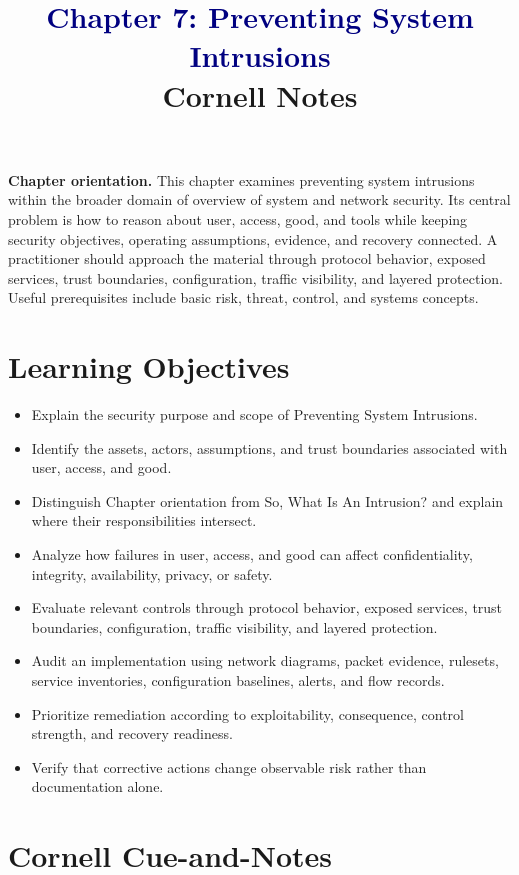 \documentclass[11pt]{article}
\title{\textcolor{Navy}{Chapter 7: Preventing System Intrusions}\\[2mm]\large Cornell Notes}
\author{}
\date{}
\begin{document}
\maketitle
\thispagestyle{fancy}
\vspace{-1.5em}
\begin{orientationbox}
\textbf{Chapter orientation.} This chapter examines preventing system intrusions within the broader domain of overview of system and network security. Its central problem is how to reason about user, access, good, and tools while keeping security objectives, operating assumptions, evidence, and recovery connected. A practitioner should approach the material through protocol behavior, exposed services, trust boundaries, configuration, traffic visibility, and layered protection. Useful prerequisites include basic risk, threat, control, and systems concepts.
\end{orientationbox}
\section*{Learning Objectives}
\begin{itemize}
\item Explain the security purpose and scope of Preventing System Intrusions.
\item Identify the assets, actors, assumptions, and trust boundaries associated with user, access, and good.
\item Distinguish Chapter orientation from So, What Is An Intrusion? and explain where their responsibilities intersect.
\item Analyze how failures in user, access, and good can affect confidentiality, integrity, availability, privacy, or safety.
\item Evaluate relevant controls through protocol behavior, exposed services, trust boundaries, configuration, traffic visibility, and layered protection.
\item Audit an implementation using network diagrams, packet evidence, rulesets, service inventories, configuration baselines, alerts, and flow records.
\item Prioritize remediation according to exploitability, consequence, control strength, and recovery readiness.
\item Verify that corrective actions change observable risk rather than documentation alone.
\end{itemize}
\section*{Cornell Cue-and-Notes}
\end{document}
